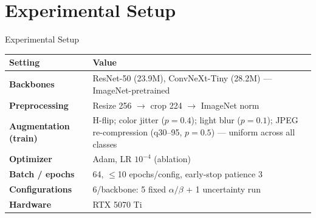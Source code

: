 \section{Experimental Setup}

\begin{frame}{Experimental Setup}
  \centering\small
  \renewcommand{\arraystretch}{1.6}
  \begin{tabularx}{.92\textwidth}{@{}>{\bfseries}lX@{}}
    \toprule
    Setting & Value \\
    \midrule
    Backbones & ResNet-50 (23.9M), ConvNeXt-Tiny (28.2M) — ImageNet-pretrained \\
    Preprocessing & Resize 256 $\to$ crop 224 $\to$ ImageNet norm \\
    Augmentation (train) & H-flip; color jitter ($p{=}0.4$); light blur ($p{=}0.1$); JPEG re-compression (q30--95, $p{=}0.5$) — uniform across all classes \\
    Optimizer & Adam, LR $10^{-4}$ (ablation) \\
    Batch / epochs & 64, $\leq$10 epochs/config, early-stop patience 3 \\
    Configurations & 6/backbone: 5 fixed $\alpha/\beta$ + 1 uncertainty run \\
    Hardware & RTX 5070 Ti \\
    \bottomrule
  \end{tabularx}
\end{frame}
